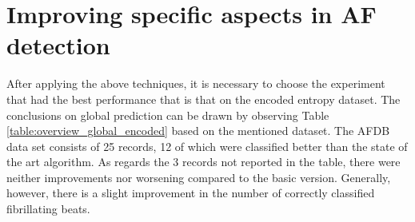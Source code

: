 \section{Improving specific aspects in AF detection}
After applying the above techniques, it is necessary to choose the experiment that had the best performance that is that on the encoded entropy dataset. The conclusions on global prediction can be drawn by observing Table \ref{table:overview_global_encoded} based on the mentioned dataset. The AFDB data set consists of 25 records, 12 of which were classified better than the state of the art algorithm. As regards the 3 records not reported in the table, there were neither improvements nor worsening compared to the basic version. Generally, however, there is a slight improvement in the number of correctly classified fibrillating beats.

